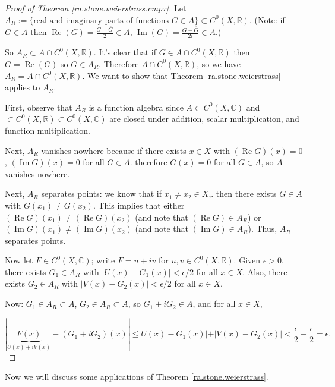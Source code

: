 \begin{proof}[Proof of Theorem \ref{ra.stone.weierstrass.cmpx}]

Let \(A_R := \{ \text{real and imaginary parts of functions } G \in A\} \subset C^0(X, \mathbb{R})\). (Note: if \(G \in A\) then \(\operatorname{Re}(G) = \frac{G + \overline{G}}{2} \in A\), \(\operatorname{Im}(G) = \frac{G - \overline{G}}{2i} \in A\).) 

So \(A_R \subset A \cap C^0(X, \mathbb{R})\). It's clear that if \(G \in A \cap C^0(X, \mathbb{R})\) then \(G = \operatorname{Re}(G)\) so \(G \in A_R\). Therefore \(A \cap C^0(X, \mathbb{R})\), so we have \(A_R = A \cap C^0(X, \mathbb{R})\). We want to show that Theorem \ref{ra.stone.weierstrass} applies to \(A_R\).

First, observe that \(A_R\) is a function algebra since \(A \subset C^0(X, \mathbb{C}) \) and \(\subset C^0(X, \mathbb{R}) \subset C^0(X, \mathbb{C})\) are closed under addition, scalar multiplication, and function multiplication.

Next, \(A_R\) vanishes nowhere because if there exists \(x \in X\) with \((\operatorname{Re} G)(x) = 0\), \((\operatorname{Im}G)(x) = 0\) for all \(G \in A\). therefore \(G(x) = 0 \) for all \(G \in A\), so \(A\) vanishes nowhere.

Next, \(A_R\) separates points: we know that if \(x_1 \neq x_2 \in X\),. then there exists \(G \in A\) with \(G(x_1) \neq G(x_2)\). This implies that either \((\operatorname{Re}G)(x_1) \neq (\operatorname{Re}G)(x_2) \) (and note that \((\operatorname{Re}G) \in A_R\)) or \((\operatorname{Im}G)(x_1) \neq (\operatorname{Im}G)(x_2) \) (and note that \((\operatorname{Im}G) \in A_R\)). Thus, \(A_R\) separates points. 

Now let \(F \in C^0(X, \mathbb{C})\); write \(F = u + iv\) for \(u, v \in C^0(X, \mathbb{R})\). Given \(\epsilon > 0\), there exists \(G_1 \in A_R\) with \(|U(x) - G_1(x)| < \epsilon/2\) for all \(x \in X\). Also, there exists \(G_2 \in A_R\) with \(|V(x) - G_2(x)| < \epsilon/2\) for all \(x \in X\).

Now: \(G_1 \in A_R \subset A\), \(G_2 \in A_R \subset A\), so \(G_1 + i G_2 \in A\), and for all \(x \in X\),

\[
| \underbrace{F(x)}_{U(x) + i V(x)} - (G_1 + i G_2)(x)| \leq U(x) - G_1(x)| + |V(x) - G_2(x)| < \frac{\epsilon}{2} + \frac{\epsilon}{2} = \epsilon.
\]

\end{proof}

Now we will discuss some applications of Theorem \ref{ra.stone.weierstrass}. 

